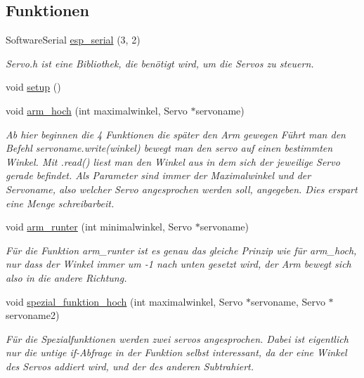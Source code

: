 \subsection*{Funktionen}
\begin{DoxyCompactItemize}
\item 
Software\+Serial \hyperlink{_arduino__kommentiert_8ino_af690b3a6882292855c4091ede8039998}{esp\+\_\+serial} (3, 2)
\begin{DoxyCompactList}\small\item\em Servo.\+h ist eine Bibliothek, die benötigt wird, um die Servos zu steuern. \end{DoxyCompactList}\item 
void \hyperlink{_arduino__kommentiert_8ino_a4fc01d736fe50cf5b977f755b675f11d}{setup} ()
\item 
void \hyperlink{_arduino__kommentiert_8ino_a74bfcf85e5418694eb99df53d30c8fab}{arm\+\_\+hoch} (int maximalwinkel, Servo $\ast$servoname)
\begin{DoxyCompactList}\small\item\em Ab hier beginnen die 4 Funktionen die später den Arm gewegen Führt man den Befehl servoname.\+write(winkel) bewegt man den servo auf einen bestimmten Winkel. Mit .read() liest man den Winkel aus in dem sich der jeweilige Servo gerade befindet. Als Parameter sind immer der Maximalwinkel und der Servoname, also welcher Servo angesprochen werden soll, angegeben. Dies erspart eine Menge schreibarbeit. \end{DoxyCompactList}\item 
void \hyperlink{_arduino__kommentiert_8ino_a5b873994166a952d81f787c307ca08d9}{arm\+\_\+runter} (int minimalwinkel, Servo $\ast$servoname)
\begin{DoxyCompactList}\small\item\em Für die Funktion arm\+\_\+runter ist es genau das gleiche Prinzip wie für arm\+\_\+hoch, nur dass der Winkel immer um -\/1 nach unten gesetzt wird, der Arm bewegt sich also in die andere Richtung. \end{DoxyCompactList}\item 
void \hyperlink{_arduino__kommentiert_8ino_ac03f54892f7473625ec7d6498ea5a010}{spezial\+\_\+funktion\+\_\+hoch} (int maximalwinkel, Servo $\ast$servoname, Servo $\ast$servoname2)
\begin{DoxyCompactList}\small\item\em Für die Spezialfunktionen werden zwei servos angesprochen. Dabei ist eigentlich nur die untige if-\/\+Abfrage in der Funktion selbst interessant, da der eine Winkel des Servos addiert wird, und der des anderen Subtrahiert. \end{DoxyCompactList}\item 

\end{DoxyCompactItemize}
